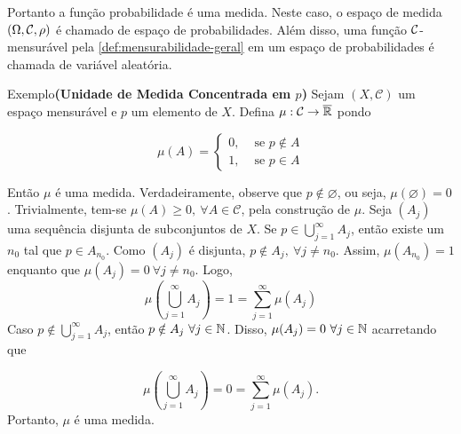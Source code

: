 Portanto a função probabilidade é uma medida.
Neste caso, o espaço de medida $(\Omega, \operatorname{\mathcal{C}},\rho)$ é chamado de espaço de probabilidades.
Além disso, uma função $\operatorname{\mathcal{C}}$-mensurável pela \ref{def:mensurabilidade-geral} em um espaço de probabilidades é chamada de variável aleatória.

\begin{env}{Exemplo}\textbf{(Unidade de Medida Concentrada em $p$)}
\label{ex:medida-concentrada-em-p}
    Sejam $(X, \mathcal{C})$ um espaço mensurável e $p$ um elemento de $X$.
    Defina $\mu: \mathcal{C} \to \operatorname{\overline{\mathbb{R}}}$ pondo

$$
\mu(A) = \left\{\begin{array}{cc}
0, & \textrm{\ se \ } p \notin A \\
1, & \textrm{\ se \ } p \in A 
\end{array}\right.$$


Então $\mu$ é uma medida.
Verdadeiramente, observe que $p \notin \varnothing$, ou seja, $\mu(\varnothing) = 0$.
Trivialmente, tem-se $\mu(A) \geq 0,\ \forall A \in \mathcal{C}$, pela construção de $\mu$.
Seja $(A_j)$ uma sequência disjunta de subconjuntos de $X$.
Se 
$
p \in \displaystyle \bigcup_{j = 1}^\infty A_j
$,
então existe um $n_0$ tal que $p \in A_{n_0}$.
Como $(A_j)$ é disjunta, $p \notin A_j, \ \forall j\neq n_0$.
Assim, $\mu(A_{n_0}) = 1$ enquanto que $\mu(A_j) = 0\ \forall j \neq n_0$.
Logo, 
$$
\mu\left( \bigcup_{j = 1}^\infty A_j\right)
=
1
=
\sum_{j=1}^{\infty} \mu(A_j)
$$
Caso
$
p \notin \displaystyle \bigcup_{j = 1}^\infty A_j
$,
então $p \notin A_j\ \forall j \in \operatorname{\mathbb{N}}$.
Disso, $\mu(A_j) = 0\ \forall j \in \operatorname{\mathbb{N}}$ acarretando que

$$
\mu\left( \bigcup_{j = 1}^\infty A_j\right)
=
0
=
\sum_{j=1}^{\infty} \mu(A_j).
$$
Portanto, $\mu$ é uma medida.
\end{env}
